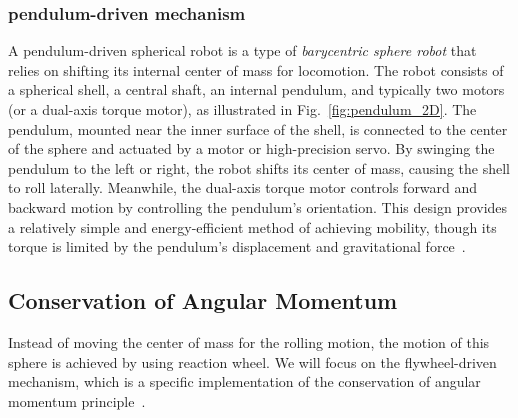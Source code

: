 \documentclass[english, bachelor, utf8]{base/thesis_telematics}
\begin{document}
\subsubsection{pendulum-driven mechanism}
A pendulum-driven spherical robot is a type of \textit{barycentric sphere robot} that relies on shifting its internal center of mass for locomotion. 
The robot consists of a spherical shell, a central shaft, an internal pendulum, and typically two motors (or a dual-axis torque motor), as illustrated in Fig.~\ref{fig:pendulum_2D}. 
The pendulum, mounted near the inner surface of the shell, is connected to the center of the sphere and actuated by a motor or high-precision servo. 
By swinging the pendulum to the left or right, the robot shifts its center of mass, causing the shell to roll laterally. 
Meanwhile, the dual-axis torque motor controls forward and backward motion by controlling the pendulum’s orientation. 
This design provides a relatively simple and energy-efficient method of achieving mobility, though its torque is limited by the pendulum’s displacement and gravitational force~\cite{pendulum_sphere,Pendulum_Driven_Spherical_Robot,roboball}.


\subsection{Conservation of Angular Momentum}
Instead of moving the center of mass for the rolling motion, the motion of this sphere is achieved by using reaction wheel. 
We will focus on the flywheel-driven mechanism, which is a specific implementation of the conservation of angular momentum principle~\cite{Aminata}.
\end{document}
